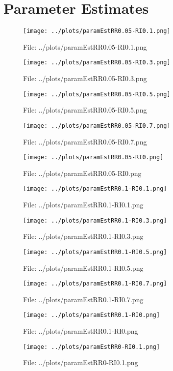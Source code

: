 \documentclass[a4paper, 11pt]{report}
\begin{document}
\section{Parameter Estimates}
\begin{figure}[h] \caption{File: ../plots/paramEstRR0.05-RI0.1.png} \texttt{[image: ../plots/paramEstRR0.05-RI0.1.png]} \end{figure}
\begin{figure}[h] \caption{File: ../plots/paramEstRR0.05-RI0.3.png} \texttt{[image: ../plots/paramEstRR0.05-RI0.3.png]} \end{figure}
\begin{figure}[h] \caption{File: ../plots/paramEstRR0.05-RI0.5.png} \texttt{[image: ../plots/paramEstRR0.05-RI0.5.png]} \end{figure}
\begin{figure}[h] \caption{File: ../plots/paramEstRR0.05-RI0.7.png} \texttt{[image: ../plots/paramEstRR0.05-RI0.7.png]} \end{figure}
\begin{figure}[h] \caption{File: ../plots/paramEstRR0.05-RI0.png} \texttt{[image: ../plots/paramEstRR0.05-RI0.png]} \end{figure}
\begin{figure}[h] \caption{File: ../plots/paramEstRR0.1-RI0.1.png} \texttt{[image: ../plots/paramEstRR0.1-RI0.1.png]} \end{figure}
\begin{figure}[h] \caption{File: ../plots/paramEstRR0.1-RI0.3.png} \texttt{[image: ../plots/paramEstRR0.1-RI0.3.png]} \end{figure}
\begin{figure}[h] \caption{File: ../plots/paramEstRR0.1-RI0.5.png} \texttt{[image: ../plots/paramEstRR0.1-RI0.5.png]} \end{figure}
\begin{figure}[h] \caption{File: ../plots/paramEstRR0.1-RI0.7.png} \texttt{[image: ../plots/paramEstRR0.1-RI0.7.png]} \end{figure}
\begin{figure}[h] \caption{File: ../plots/paramEstRR0.1-RI0.png} \texttt{[image: ../plots/paramEstRR0.1-RI0.png]} \end{figure}
\begin{figure}[h] \caption{File: ../plots/paramEstRR0-RI0.1.png} \texttt{[image: ../plots/paramEstRR0-RI0.1.png]} \end{figure}
\end{document}
